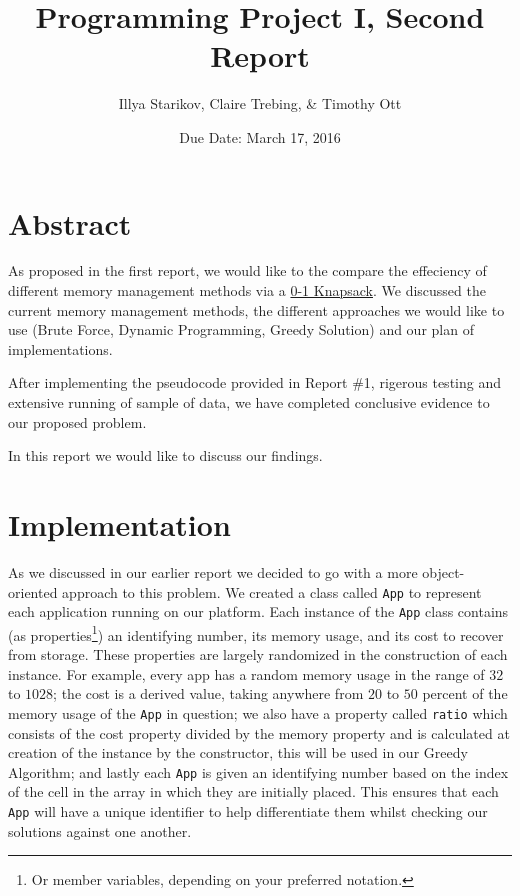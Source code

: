 \documentclass{article}
\title{Programming Project I, Second Report}
\author{Illya Starikov, Claire Trebing, \& Timothy Ott}
\date{Due Date: March 17, 2016}
\newcommand{\ignore}[1]{}
\begin{document}
\maketitle

\section{Abstract}
As proposed in the first report, we would like to the compare the effeciency of different memory management methods via a \href{https://en.wikipedia.org/wiki/Knapsack_problem#0.2F1_knapsack_problem}{0-1 Knapsack}. We discussed the current memory management methods, the different approaches we would like to use (Brute Force, Dynamic Programming, Greedy Solution) and our plan of implementations.

After implementing the pseudocode provided in Report \#1, rigerous testing and extensive running of sample of data, we have completed conclusive evidence to our proposed problem.

In this report we would like to discuss our findings.

\section{Implementation}
As we discussed in our earlier report we decided to go with a more object-oriented approach to this problem. We created a class called \texttt{App} to represent each application running on our platform. Each instance of the \texttt{App} class contains (as properties\footnote{Or member variables, depending on your preferred notation.}) an identifying number, its memory usage, and its cost to recover from storage. These properties are largely randomized in the construction of each instance. For example, every app has a random memory usage in the range of $32$ to $1028$; the cost is a derived value, taking anywhere from $20$ to $50$ percent of the memory usage of the \texttt{App} in question; we also have a property called \texttt{ratio} which consists of the cost property divided by the memory property and is calculated at creation of the instance by the constructor, this will be used in our Greedy Algorithm; and lastly each \texttt{App} is given an identifying number based on the index of the cell in the array in which they are initially placed. This ensures that each \texttt{App} will have a unique identifier to help differentiate them whilst\ignore{Sorry, couldn't resist swapping out while for whilst!} checking our solutions against one another.
\end{document}
